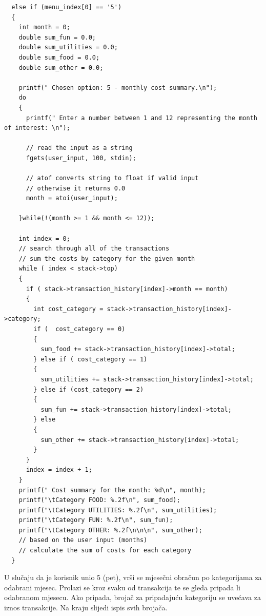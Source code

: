 \documentclass[12pt, letterpaper]{article}
\begin{document}
  \begin{verbatim}
  else if (menu_index[0] == '5')
  {
    int month = 0;
    double sum_fun = 0.0;
    double sum_utilities = 0.0;
    double sum_food = 0.0;
    double sum_other = 0.0;

    printf(" Chosen option: 5 - monthly cost summary.\n");
    do
    {
      printf(" Enter a number between 1 and 12 representing the month of interest: \n");

      // read the input as a string
      fgets(user_input, 100, stdin);  

      // atof converts string to float if valid input
      // otherwise it returns 0.0
      month = atoi(user_input);

    }while(!(month >= 1 && month <= 12));

    int index = 0;
    // search through all of the transactions
    // sum the costs by category for the given month
    while ( index < stack->top)
    {
      if ( stack->transaction_history[index]->month == month)
      {
        int cost_category = stack->transaction_history[index]->category;
        if (  cost_category == 0)
        {
          sum_food += stack->transaction_history[index]->total;
        } else if ( cost_category == 1)
        {
          sum_utilities += stack->transaction_history[index]->total;
        } else if (cost_category == 2)
        {
          sum_fun += stack->transaction_history[index]->total;
        } else
        {
          sum_other += stack->transaction_history[index]->total;
        }
      }
      index = index + 1;
    }
    printf(" Cost summary for the month: %d\n", month);
    printf("\tCategory FOOD: %.2f\n", sum_food);
    printf("\tCategory UTILITIES: %.2f\n", sum_utilities);
    printf("\tCategory FUN: %.2f\n", sum_fun);
    printf("\tCategory OTHER: %.2f\n\n\n", sum_other);
    // based on the user input (months)
    // calculate the sum of costs for each category
  }
  \end{verbatim}
  U slučaju da je korisnik unio 5 (pet), vrši se mjesečni obračun po kategorijama za odabrani mjesec. Prolazi se kroz svaku od transakcija te se gleda pripada li odabranom mjesecu. Ako pripada, brojač za pripadajuću kategoriju se uvećava za iznos transakcije. Na kraju slijedi ispis svih brojača.
\end{document}
